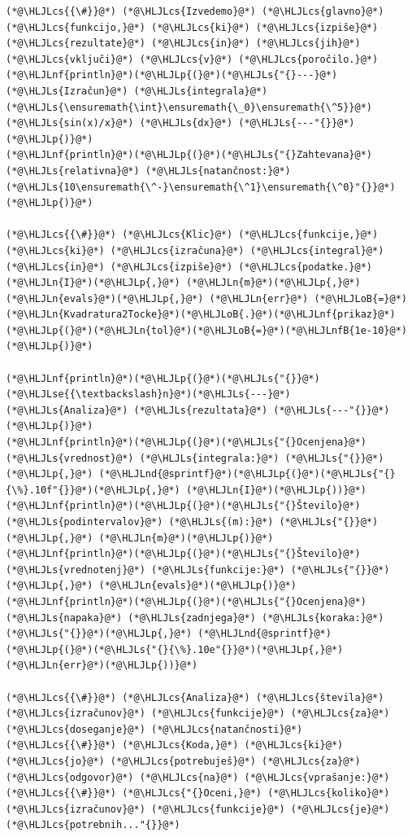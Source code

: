 \documentclass[12pt,a4paper]{article}
\newcommand{\HLJLn}[1]{#1}
\newcommand{\HLJLnd}[1]{\textcolor[RGB]{214,102,97}{#1}}
\newcommand{\HLJLnf}[1]{\textcolor[RGB]{66,102,213}{#1}}
\newcommand{\HLJLs}[1]{\textcolor[RGB]{201,61,57}{#1}}
\newcommand{\HLJLse}[1]{\textcolor[RGB]{59,151,46}{#1}}
\newcommand{\HLJLnfB}[1]{\textcolor[RGB]{59,151,46}{#1}}
\newcommand{\HLJLoB}[1]{\textcolor[RGB]{102,102,102}{\textbf{#1}}}
\newcommand{\HLJLp}[1]{#1}
\newcommand{\HLJLcs}[1]{\textcolor[RGB]{153,153,119}{\textit{#1}}}
\begin{document}
\begin{lstlisting}
(*@\HLJLcs{{\#}}@*) (*@\HLJLcs{Izvedemo}@*) (*@\HLJLcs{glavno}@*) (*@\HLJLcs{funkcijo,}@*) (*@\HLJLcs{ki}@*) (*@\HLJLcs{izpiše}@*) (*@\HLJLcs{rezultate}@*) (*@\HLJLcs{in}@*) (*@\HLJLcs{jih}@*) (*@\HLJLcs{vključi}@*) (*@\HLJLcs{v}@*) (*@\HLJLcs{poročilo.}@*)
(*@\HLJLnf{println}@*)(*@\HLJLp{(}@*)(*@\HLJLs{"{}---}@*) (*@\HLJLs{Izračun}@*) (*@\HLJLs{integrala}@*) (*@\HLJLs{\ensuremath{\int}\ensuremath{\_0}\ensuremath{\^5}}@*) (*@\HLJLs{sin(x)/x}@*) (*@\HLJLs{dx}@*) (*@\HLJLs{---"{}}@*)(*@\HLJLp{)}@*)
(*@\HLJLnf{println}@*)(*@\HLJLp{(}@*)(*@\HLJLs{"{}Zahtevana}@*) (*@\HLJLs{relativna}@*) (*@\HLJLs{natančnost:}@*) (*@\HLJLs{10\ensuremath{\^-}\ensuremath{\^1}\ensuremath{\^0}"{}}@*)(*@\HLJLp{)}@*)

(*@\HLJLcs{{\#}}@*) (*@\HLJLcs{Klic}@*) (*@\HLJLcs{funkcije,}@*) (*@\HLJLcs{ki}@*) (*@\HLJLcs{izračuna}@*) (*@\HLJLcs{integral}@*) (*@\HLJLcs{in}@*) (*@\HLJLcs{izpiše}@*) (*@\HLJLcs{podatke.}@*)
(*@\HLJLn{I}@*)(*@\HLJLp{,}@*) (*@\HLJLn{m}@*)(*@\HLJLp{,}@*) (*@\HLJLn{evals}@*)(*@\HLJLp{,}@*) (*@\HLJLn{err}@*) (*@\HLJLoB{=}@*) (*@\HLJLn{Kvadratura2Tocke}@*)(*@\HLJLoB{.}@*)(*@\HLJLnf{prikaz}@*)(*@\HLJLp{(}@*)(*@\HLJLn{tol}@*)(*@\HLJLoB{=}@*)(*@\HLJLnfB{1e-10}@*)(*@\HLJLp{)}@*)

(*@\HLJLnf{println}@*)(*@\HLJLp{(}@*)(*@\HLJLs{"{}}@*)(*@\HLJLse{{\textbackslash}n}@*)(*@\HLJLs{---}@*) (*@\HLJLs{Analiza}@*) (*@\HLJLs{rezultata}@*) (*@\HLJLs{---"{}}@*)(*@\HLJLp{)}@*)
(*@\HLJLnf{println}@*)(*@\HLJLp{(}@*)(*@\HLJLs{"{}Ocenjena}@*) (*@\HLJLs{vrednost}@*) (*@\HLJLs{integrala:}@*) (*@\HLJLs{"{}}@*)(*@\HLJLp{,}@*) (*@\HLJLnd{@sprintf}@*)(*@\HLJLp{(}@*)(*@\HLJLs{"{}{\%}.10f"{}}@*)(*@\HLJLp{,}@*) (*@\HLJLn{I}@*)(*@\HLJLp{))}@*)
(*@\HLJLnf{println}@*)(*@\HLJLp{(}@*)(*@\HLJLs{"{}Število}@*) (*@\HLJLs{podintervalov}@*) (*@\HLJLs{(m):}@*) (*@\HLJLs{"{}}@*)(*@\HLJLp{,}@*) (*@\HLJLn{m}@*)(*@\HLJLp{)}@*)
(*@\HLJLnf{println}@*)(*@\HLJLp{(}@*)(*@\HLJLs{"{}Število}@*) (*@\HLJLs{vrednotenj}@*) (*@\HLJLs{funkcije:}@*) (*@\HLJLs{"{}}@*)(*@\HLJLp{,}@*) (*@\HLJLn{evals}@*)(*@\HLJLp{)}@*)
(*@\HLJLnf{println}@*)(*@\HLJLp{(}@*)(*@\HLJLs{"{}Ocenjena}@*) (*@\HLJLs{napaka}@*) (*@\HLJLs{zadnjega}@*) (*@\HLJLs{koraka:}@*) (*@\HLJLs{"{}}@*)(*@\HLJLp{,}@*) (*@\HLJLnd{@sprintf}@*)(*@\HLJLp{(}@*)(*@\HLJLs{"{}{\%}.10e"{}}@*)(*@\HLJLp{,}@*) (*@\HLJLn{err}@*)(*@\HLJLp{))}@*)

(*@\HLJLcs{{\#}}@*) (*@\HLJLcs{Analiza}@*) (*@\HLJLcs{števila}@*) (*@\HLJLcs{izračunov}@*) (*@\HLJLcs{funkcije}@*) (*@\HLJLcs{za}@*) (*@\HLJLcs{doseganje}@*) (*@\HLJLcs{natančnosti}@*)
(*@\HLJLcs{{\#}}@*) (*@\HLJLcs{Koda,}@*) (*@\HLJLcs{ki}@*) (*@\HLJLcs{jo}@*) (*@\HLJLcs{potrebuješ}@*) (*@\HLJLcs{za}@*) (*@\HLJLcs{odgovor}@*) (*@\HLJLcs{na}@*) (*@\HLJLcs{vprašanje:}@*)
(*@\HLJLcs{{\#}}@*) (*@\HLJLcs{"{}Oceni,}@*) (*@\HLJLcs{koliko}@*) (*@\HLJLcs{izračunov}@*) (*@\HLJLcs{funkcije}@*) (*@\HLJLcs{je}@*) (*@\HLJLcs{potrebnih..."{}}@*)


\end{lstlisting}
\end{document}
